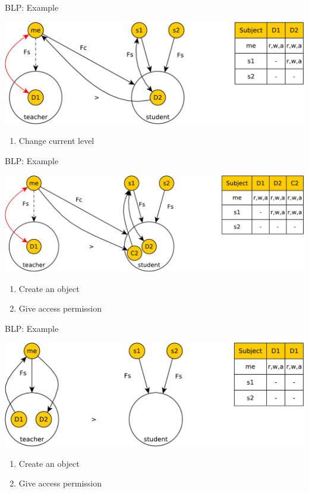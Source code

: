 \documentclass{beamer}
\begin{document}
\begin{frame}[t]{BLP: Example}
  \begin{center}
    \includegraphics[width=0.8\linewidth]{ex9}
  \end{center}
\begin{enumerate}
  \item Change current level
\end{enumerate}
\end{frame}

\begin{frame}[t]{BLP: Example}
  \begin{center}
    \includegraphics[width=0.8\linewidth]{ex10}
  \end{center}
\begin{enumerate}
  \item Create an object
  \item Give access permission
\end{enumerate}
\end{frame}

\begin{frame}[t]{BLP: Example}
  \begin{center}
    \includegraphics[width=0.8\linewidth]{ex11}
  \end{center}
\begin{enumerate}
  \item Create an object
  \item Give access permission
\end{enumerate}
\end{frame}
\end{document}

